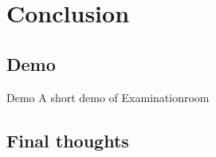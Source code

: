 \documentclass[12pt,ucs,hyperref={pdftext}]{beamer}
\newcommand{\comment}[1]{}
\newlength{\columnleft}
\newlength{\columnright}
\begin{document}
\comment{
\begin{frame}{Example}
\begin{columns}

\column{\columnleft}

\column{\columnright}
\begin{itemize}%
\item TODO
\end{itemize}

\end{columns}
\end{frame}
}

\section{Conclusion}

\subsection{Demo}

\begin{frame}{Demo}
A short demo of Examinationroom
\end{frame}


\subsection{Final thoughts}
\end{document}
